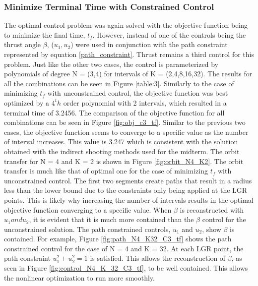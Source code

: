 \documentclass[]{article}
\begin{document}
	\subsubsection{Minimize Terminal Time with Constrained Control}
	 The optimal control problem was again solved with the objective function being to minimize the final time, \(t_f\). However, instead of one of the controls being the thrust angle \(\beta\), (\(u_1,u_2\)) were used in conjunction with the path constraint represented by equation \ref{path_constraint}. Thrust remains a third control for this problem. Just like the other two cases, the control is parameterized by polynomials of degree N = (3,4) for intervals of K = (2,4,8,16,32). The results for all the combinations can be seen in Figure \ref{table:3}. Similarly to the case of minimizing \(t_f\) with unconstrained control, the objective function was best optimized by a \(4^th\) order polynomial with 2 intervals, which resulted in a terminal time of 3.2456. The comparison of the objective function for all combinations can be seen in Figure \ref{fig:obj_c3_tf}. Similar to the previous two cases, the objective function seems to converge to a specific value as the number of interval increases. This value is 3.247 which is consistent with the solution obtained with the indirect shooting methods used for the midterm. The orbit transfer for N = 4 and K = 2 is shown in Figure \ref{fig:orbit_N4_K2}. The orbit transfer is much like that of optimal one for the case of minimizing \(t_f\) with unconstrained control. The first two segments create paths that result in a radius less than the lower bound due to the constraints only being applied at the LGR points. This is likely why increasing the number of intervals results in the optimal objective function converging to a specific value. When \(\beta\) is reconstructed with \(u_1 and u_2\), it is evident that it is much more contained than the \(\beta\) control for the unconstrained solution. The path constrained controls, \(u_1\) and \(u_2\), show \(\beta\) is contained. For example, Figure \ref{fig:path_N4_K32_C3_tf} shows the path constrained control for the case of N = 4 and K = 32. At each LGR point, the path constraint \(u_1^2 + u_2^2 = 1\) is satisfied. This allows the reconstruction of \(\beta\), as seen in Figure \ref{fig:control_N4_K_32_C3_tf}, to be well contained. This allows the nonlinear optimization to run more smoothly.
\end{document}
